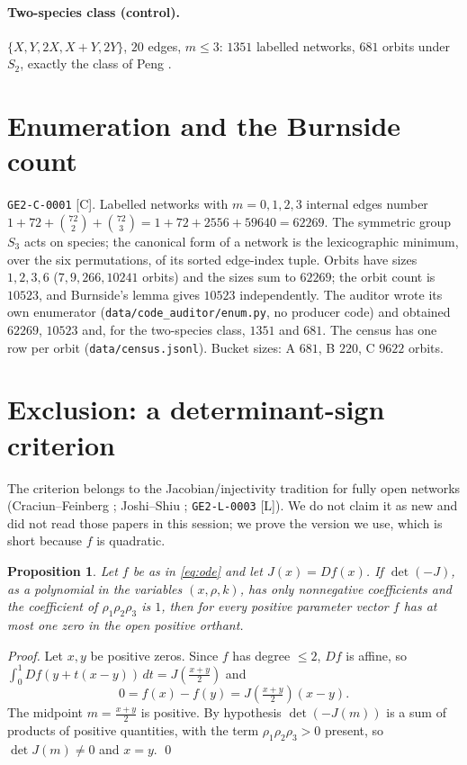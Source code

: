 \documentclass[11pt]{article}
\newcommand{\tier}[1]{\textsf{[#1]}}
\newcommand{\tL}{\tier{L}}
\newcommand{\tC}{\tier{C}}
\newtheorem{prop}{Proposition}
\begin{document}
\paragraph{Two-species class (control).} $\{X,Y,2X,X{+}Y,2Y\}$, $20$ edges, $m\le3$: $1351$ labelled networks, $681$ orbits under $S_2$, exactly the class of Peng \cite{peng}.

\section{Enumeration and the Burnside count}\label{sec:enum}
\texttt{GE2-C-0001} \tC{}. Labelled networks with $m=0,1,2,3$ internal edges number $1+72+\binom{72}{2}+\binom{72}{3}=1+72+2556+59640=62269$. The symmetric group $S_3$ acts on species; the canonical form of a network is the lexicographic minimum, over the six permutations, of its sorted edge-index tuple. Orbits have sizes $1,2,3,6$ ($7,9,266,10241$ orbits) and the sizes sum to $62269$; the orbit count is $10523$, and Burnside's lemma gives $10523$ independently. The auditor wrote its own enumerator (\texttt{data/code\_auditor/enum.py}, no producer code) and obtained $62269$, $10523$ and, for the two-species class, $1351$ and $681$. The census has one row per orbit (\texttt{data/census.jsonl}). Bucket sizes: A $681$, B $220$, C $9622$ orbits.

\section{Exclusion: a determinant-sign criterion}\label{sec:excl}
The criterion belongs to the Jacobian/injectivity tradition for fully open networks (Craciun--Feinberg \cite{cf05,cf06}; Joshi--Shiu \cite{js12}; \texttt{GE2-L-0003} \tL{}). We do not claim it as new and did not read those papers in this session; we prove the version we use, which is short because $f$ is quadratic.

\begin{prop}\label{prop:jac}
Let $f$ be as in \eqref{eq:ode} and let $J(x)=Df(x)$. If $\det(-J)$, as a polynomial in the variables $(x,\rho,k)$, has only nonnegative coefficients and the coefficient of $\rho_1\rho_2\rho_3$ is $1$, then for every positive parameter vector $f$ has at most one zero in the open positive orthant.
\end{prop}
\emph{Proof.} Let $x,y$ be positive zeros. Since $f$ has degree $\le2$, $Df$ is affine, so $\int_0^1 Df(y+t(x-y))\,dt=J(\tfrac{x+y}2)$ and
\[0=f(x)-f(y)=J\!\left(\tfrac{x+y}2\right)(x-y).\]
The midpoint $m=\frac{x+y}2$ is positive. By hypothesis $\det(-J(m))$ is a sum of products of positive quantities, with the term $\rho_1\rho_2\rho_3>0$ present, so $\det J(m)\neq0$ and $x=y$. \qed
\end{document}
